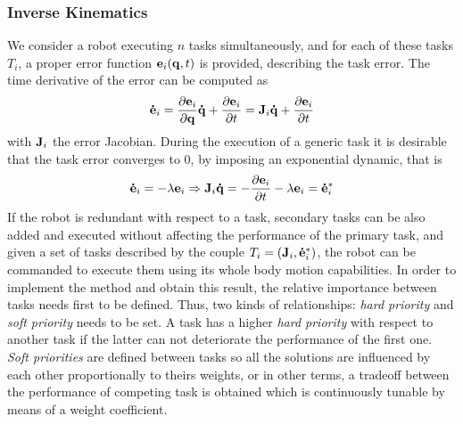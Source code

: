 \subsubsection{Inverse Kinematics}
We consider a robot executing $n$ tasks simultaneously, and for each of these tasks $T_i$, a proper error function $\mathbf{e}_i(\mathbf{q},t)$ is provided, describing the task error.
The time derivative of the error can be computed as
\begin{equation}
\mathbf{\dot{e}}_i = \frac{\partial \mathbf{e}_i}{\partial \mathbf{q}}\mathbf{\dot{q}} + \frac{\partial \mathbf{e}_i}{\partial t} = \mathbf{J}_i\mathbf{\dot{q}} + \frac{\partial \mathbf{e}_i}{\partial t}
\end{equation} 
with $\mathbf{J}_i$ the error Jacobian. During the execution of a generic task it is desirable that the task error converges to 0, by imposing an exponential dynamic, that is
\begin{equation}
\mathbf{\dot{e}}_i= - \lambda \mathbf{e}_i \Rightarrow \mathbf{J}_i\mathbf{\dot{q}} = -\frac{\partial \mathbf{e}_i}{\partial t} - \lambda \mathbf{e}_i = \mathbf{\dot{e}}^*_i
\end{equation}
If the robot is redundant with respect to a task, secondary tasks can be also added and executed without affecting the performance of the primary task, and given a set of tasks described by the couple 
$T_i = (\mathbf{J}_i, \mathbf{\dot{e}}^*_i)$, the robot can be commanded to execute them using its whole body motion capabilities. In order to implement the method and obtain this result, the relative importance between tasks needs first to be defined. Thus, two kinds of relationships: \emph{hard priority} and \emph{soft priority} needs to be set. 
A task has a higher \emph{hard priority} with respect to another task if the latter can not deteriorate the performance of the first one. \emph{Soft priorities} are defined between tasks so all the solutions are influenced by each other proportionally to theirs weights, or in other terms, a tradeoff between the performance of competing task is obtained which is continuously tunable by means of a weight coefficient.

